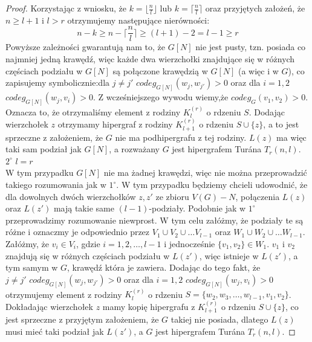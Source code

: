 \documentclass[miz,woman]{mgrwms}
\begin{document}
\begin{proof}
Korzystając z wniosku, że $k=\lfloor \frac{n}{l} \rfloor$ lub $k=\lceil \frac{n}{l} \rceil$ oraz przyjętych założeń,
że $n \geq l+1$ i $l>r$ otrzymujemy następujące nierówności:
\begin{equation}
 n-k\geq n-\lceil \frac{n}{l} \rceil \geq (l+1)-2=l-1 \geq r
\end{equation}
Powyższe zależności gwarantują nam to, że $G[N]$ nie jest pusty, tzn. posiada co najmniej jedną krawędź, więc każde dwa
wierzchołki znajdujące się w różnych częściach podziału w $G[N]$ są połączone krawędzią w $G[N]$ (a więc i w $G$),
 co zapisujemy symbolicznie:dla $j \not =j'$ $codeg_{G[N]}(w_j,w_{j'})>0$ oraz dla $i=1,2$ $codeg_{G[N]}(w_j,v_i)>0$.
 Z wcześniejszego
wywodu wiemy,że $codeg_G(v_1,v_2)>0$. Oznacza to, że otrzymaliśmy element z rodziny $K_l^{(r)}$ o rdzeniu $S$. Dodając
wierzchołek $z$ otrzymamy hipergraf z rodziny $K_{l+1}^{(r)}$ o rdzeniu $S\cup \{z\}$, a to jest sprzeczne z założeniem, że
$G$ nie ma podhipergrafu z tej rodziny. $L(z)$ ma więc taki sam podział jak $G[N]$, a rozważany  $G$ jest hipergrafem
Tur\'ana $T_r(n,l)$.\\
$2^{\circ}$ $l=r$\\
W tym przypadku $G[N]$ nie ma żadnej krawędzi, więc nie można przeprowadzić takiego rozumowania jak w $1^{\circ}$. W tym
przypadku będziemy chcieli udowodnić, że dla dowolnych dwóch wierzchołków $z, z'$ ze zbioru $V(G)-N$, połączenia
$L(z)$ oraz $L(z')$ mają takie same $(l-1)$-podziały. Podobnie jak w $1^{\circ}$ przeprowadzimy rozumowanie niewprost. 
W tym celu załóżmy, że podziały te są różne i oznaczmy je odpowiednio przez $V_1\cup V_2\cup \dots V_{l-1}$ oraz $W_1\cup 
W_2\cup \dots W_{l-1}$. Załóżmy, że $v_i \in V_i$, gdzie $i=1,2,\dots,l-1$ i jednocześnie 
$\{v_1,v_2\}\in W_1$. $v_1$ i $v_2$ znajdują się w różnych częściach podziału w $L(z')$, więc istnieje w $L(z')$, a tym 
samym w $G$, krawędź która je zawiera. Dodając do tego fakt, że \\
$j \not =j'$ $codeg_{G[N]}(w_j,w_{j'})>0$ oraz dla
 $i=1,2$ $codeg_{G[N]}(w_j,v_i)>0$ otrzymujemy element z rodziny $K_l^{(r)}$ o rdzeniu $S=\{w_2,w_3,\dots,w_{l-1},v_1,v_2\}$.
Dokładając wierzchołek $z$ mamy kopię hipergrafu z $K_{l+1}^{(r)}$ o rdzeniu $S\cup \{z\}$, co jest sprzeczne z przyjętym
założeniem, że $G$ takiej nie posiada, dlatego $L(z)$ musi mieć taki podział jak $L(z')$, a $G$ jest hipergrafem
Tur\'ana $T_r(n,l)$.
\end{proof}
\end{document}
